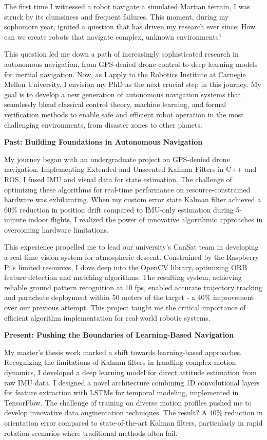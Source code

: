 \documentclass[a4,20pt]{article}
\begin{document}
\begin{large} 


The first time I witnessed a robot navigate a simulated Martian terrain, I was struck by its clumsiness and frequent failures. This moment, during my sophomore year, ignited a question that has driven my research ever since: How can we create robots that navigate complex, unknown environments?

This question led me down a path of increasingly sophisticated research in autonomous navigation, from GPS-denied drone control to deep learning models for inertial navigation. Now, as I apply to the Robotics Institute at Carnegie Mellon University, I envision my PhD as the next crucial step in this journey. My goal is to develop a new generation of autonomous navigation systems that seamlessly blend classical control theory, machine learning, and formal verification methods to enable safe and efficient robot operation in the most challenging environments, from disaster zones to other planets.

\textbf{Past: Building Foundations in Autonomous Navigation}

My journey began with an undergraduate project on GPS-denied drone navigation. Implementing Extended and Unscented Kalman Filters in C++ and ROS, I fused IMU and visual data for state estimation. The challenge of optimizing these algorithms for real-time performance on resource-constrained hardware was exhilarating. When my custom error state Kalman filter achieved a 60\% reduction in position drift compared to IMU-only estimation during 5-minute indoor flights, I realized the power of innovative algorithmic approaches in overcoming hardware limitations.

This experience propelled me to lead our university's CanSat team in developing a real-time vision system for atmospheric descent. Constrained by the Raspberry Pi's limited resources, I dove deep into the OpenCV library, optimizing ORB feature detection and matching algorithms. The resulting system, achieving reliable ground pattern recognition at 10 fps, enabled accurate trajectory tracking and parachute deployment within 50 meters of the target - a 40\% improvement over our previous attempt. This project taught me the critical importance of efficient algorithm implementation for real-world robotic systems.

\textbf{Present: Pushing the Boundaries of Learning-Based Navigation}

My master's thesis work marked a shift towards learning-based approaches. Recognizing the limitations of Kalman filters in handling complex motion dynamics, I developed a deep learning model for direct attitude estimation from raw IMU data. I designed a novel architecture combining 1D convolutional layers for feature extraction with LSTMs for temporal modeling, implemented in TensorFlow. The challenge of training on diverse motion profiles pushed me to develop innovative data augmentation techniques. The result? A 40\% reduction in orientation error compared to state-of-the-art Kalman filters, particularly in rapid rotation scenarios where traditional methods often fail.


\end{large}
\end{document}
